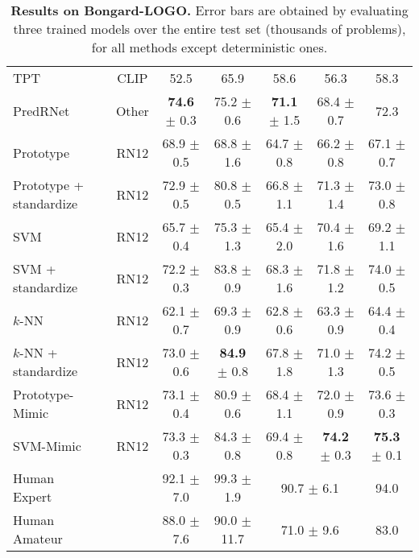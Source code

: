 \begin{table*}
\begin{tabular}{lcccccc}
    TPT~\cite{shu2022testtime} & CLIP &52.5 & 65.9 & 58.6 & 56.3  &  58.3\\
    PredRNet~\cite{yang2023neural} & Other & \textbf{74.6} $\pm$ 0.3 & 75.2 $\pm$ 0.6 & \textbf{71.1} $\pm$ 1.5 & 68.4 $\pm$ 0.7 &  72.3 \\
    \midrule
    Prototype & RN12 & 68.9 $\pm$ 0.5 & 68.8 $\pm$ 1.6 & 64.7 $\pm$ 0.8 & 66.2 $\pm$ 0.8 & 67.1 $\pm$ 0.7 \\
    Prototype + standardize & RN12 & 72.9 $\pm$ 0.5 & 80.8 $\pm$ 0.5 & 66.8 $\pm$ 1.1 & 71.3 $\pm$ 1.4 & 73.0 $\pm$ 0.8 \\
    SVM & RN12 & 65.7 $\pm$ 0.4 & 75.3 $\pm$ 1.3 & 65.4 $\pm$ 2.0 & 70.4 $\pm$ 1.6 & 69.2 $\pm$ 1.1 \\
    SVM + standardize & RN12 & 72.2 $\pm$ 0.3 & 83.8 $\pm$ 0.9 & 68.3 $\pm$ 1.6 & 71.8 $\pm$ 1.2 & 74.0 $\pm$ 0.5 \\
    $k$-NN & RN12 & 62.1 $\pm$ 0.7 & 69.3 $\pm$ 0.9 & 62.8 $\pm$ 0.6 & 63.3 $\pm$ 0.9 & 64.4 $\pm$ 0.4 \\
    $k$-NN + standardize & RN12 & 73.0 $\pm$ 0.6 & \textbf{84.9} $\pm$ 0.8 & 67.8 $\pm$ 1.8 & 71.0 $\pm$ 1.3 & 74.2 $\pm$ 0.5 \\
    Prototype-Mimic & RN12 & 73.1 $\pm$ 0.4 & 80.9 $\pm$ 0.6 & 68.4 $\pm$ 1.1 & 72.0 $\pm$ 0.9 & 73.6 $\pm$ 0.3\\
    SVM-Mimic & RN12 & 73.3 $\pm$ 0.3  &  84.3 $\pm$ 0.8 & 69.4 $\pm$ 0.8  & \textbf{74.2} $\pm$ 0.3 & \textbf{75.3} $\pm$ 0.1 \\
    \midrule
    Human Expert~\cite{nie2021bongardlogo} & & 92.1 $\pm$ 7.0 & 99.3 $\pm$ 1.9 & \multicolumn{2}{c}{90.7 $\pm$ 6.1}  &  94.0 \\
    Human Amateur~\cite{nie2021bongardlogo}&  & 88.0 $\pm$ 7.6 & 90.0 $\pm$ 11.7 & \multicolumn{2}{c}{71.0 $\pm$ 9.6} &  83.0 \\
    \bottomrule
  \end{tabular}
    \caption{\textbf{Results on Bongard-LOGO.}
    Error bars are obtained by evaluating three trained models over the entire test set (thousands of problems), for all methods except deterministic ones.}
    \label{tab:logo}

\end{table*}

